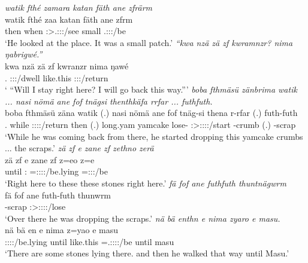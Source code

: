 \begin{exe}
	\emph{watik fthé zamara katan fäth ane zfrärm}\\
	\gll watik fthé zaa katan fäth ane zfrm\\ 
	then when \Sg:\Sbj>\Tsg.\F:\Obj:\Pst:\Pfv/see small \Dim{} {\Dem} \Tsg.\F:\Sbj:\Pst:\Dur/be\\
	\trans `He looked at the place. It was a small patch.'
	\emph{``kwa nzä zä zf kwramnzr? nima ŋabrigwé.''}\\
	\gll kwa nzä zä zf kwranzr nima ŋawé\\ 
	{\Fut} \Fsg.{\Abs} {\Prox} {\Imm} \Fsg:\Sbj:\Irr:\Ipfv/dwell like.this \Fsg:\Sbj:\Nonpast:\Ipfv/return\\
	\trans ` ``Will I stay right here? I will go back this way.'''
	\emph{boba fthmäsü zänbrima watik ... nasi nömä ane fof tnägsi thenthkäfa rrfar ... futhfuth.}\\
	\gll boba fthmäsü zäna watik (.) nasi nömä ane fof tnäg-si thena r-rfar (.) futh-futh\\ 
	\Med.{\Abl} while \Sg:\Sbj:\Pst:\Pfv:\Venit/return then (.) long.yam yamcake {\Dem} {\Emph} lose-{\Nmlz} \Sg:\Sbj>\Stpl:\Obj:\Pst:\Pfv:\Venit/start \Redup-crumb (.) \Redup-scrap\\
	\trans `While he was coming back from there, he started dropping this yamcake crumbs ... the scraps.'
	\emph{zä zf e zane zf zethno zerä}\\
	\gll zä zf e zane zf z=eo z=e\\ 
	{\Prox} {\Imm} until \Dem:{\Prox} {\Imm} \Prox=\Stpl:\Sbj:\Nonpast:\Stat:\Andat/be.lying \Prox=\Stpl:\Sbj:\Nonpast:\Ipfv/be\\
	\trans `Right here to these these stones right here.'
	\emph{fä fof ane futhfuth thuntnägwrm}\\
	\gll fä fof ane futh-futh thunwrm\\ 
	{\Dist} {\Emph} {\Dem} \Redup-scrap \Sg:\Sbj>\Stpl:\Obj:\Pst:\Dur:\Venit/lose\\
	\trans `Over there he was dropping the scraps.'
	\emph{nä bä enthn e nima zyaro e masu.}\\
	\gll nä bä en e nima z=yao e masu\\ 
	{\Indf} \Med{} \Stpl:\Sbj:\Nonpast:\Stat:\Venit/be.lying until like.this \Prox=\Tsg.\Masc:\Sbj:\Pst:\Ipfv:\Andat/be until masu\\
	\trans `There are some stones lying there. and then he walked that way until Masu.'

\end{exe}
